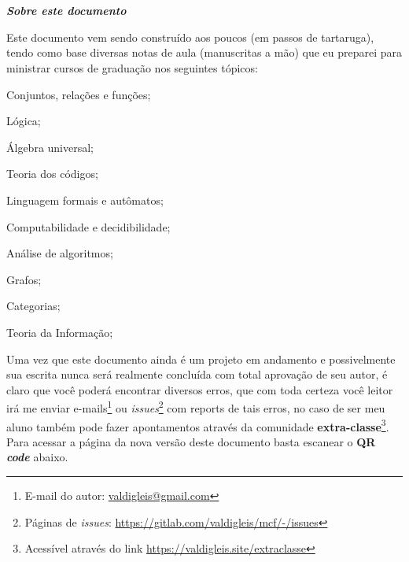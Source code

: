 \begingroup

\newpage \thispagestyle{empty} \
\newpage

\thispagestyle{empty}
\begin{center}
	{\normalfont\fontsize{20}{20}\sffamily\selectfont {\color{NordAurora5}\faLightbulb} \\ \textbf{\textit{Sobre este documento}}}\par
\end{center}


Este documento vem sendo construído aos poucos ({\color{NordAurora1}em passos de tartaruga}), tendo como base diversas notas de aula (manuscritas a mão) que eu preparei  para ministrar cursos de graduação nos seguintes tópicos:


\begin{multicols}{2}
	\begin{fieldsList}
		\item Conjuntos, relações e funções;
		\item Lógica;
		\item Álgebra universal;
		\item Teoria dos códigos;
		\item Linguagem formais e autômatos;
		\item Computabilidade e decidibilidade;
		\item Análise de algoritmos;
		\item Grafos;
		\item Categorias;
		\item Teoria da Informação;
	\end{fieldsList}
\end{multicols}	

Uma vez que este documento ainda é um projeto em andamento e possivelmente sua escrita nunca será realmente concluída com total aprovação de seu autor, é claro que você poderá encontrar diversos erros, que com toda certeza você leitor irá me enviar e-mails\footnote{E-mail do autor: \url{valdigleis@gmail.com}} ou \textit{issues}\footnote{Páginas de \textit{issues}: \url{https://gitlab.com/valdigleis/mcf/-/issues}} com reports de tais erros, no caso de ser meu aluno também pode fazer apontamentos através da comunidade \textbf{extra-classe}\footnote{Acessível através do link \url{https://valdigleis.site/extraclasse}}. Para acessar a página da nova versão deste documento basta escanear o \textbf{QR \textit{code}} abaixo.

